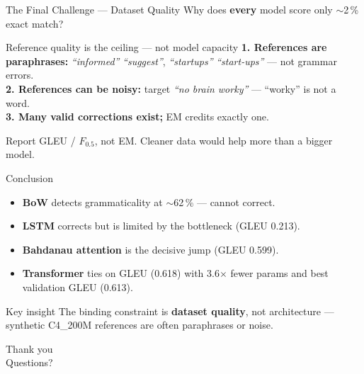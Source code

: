 \documentclass[aspectratio=169,11pt]{beamer}
\begin{document}
\begin{frame}{The Final Challenge --- Dataset Quality}
Why does \textbf{every} model score only $\sim$2\,\% exact match?
\vspace{0.6em}
\begin{block}{Reference quality is the ceiling --- not model capacity}
\small
\textbf{1. References are paraphrases:} \emph{``informed''}\,\textrightarrow{}\,\emph{``suggest''},
\emph{``startups''}\,\textrightarrow{}\,\emph{``start-ups''} --- not grammar errors.\\[3pt]
\textbf{2. References can be noisy:} target \emph{``no brain worky''} --- ``worky''
is not a word.\\[3pt]
\textbf{3. Many valid corrections exist;} EM credits exactly one.
\end{block}
\centering \small
\textrightarrow{} Report GLEU / $F_{0.5}$, not EM. Cleaner data would help more
than a bigger model.
\end{frame}

\begin{frame}{Conclusion}
\begin{itemize}
  \item \textbf{BoW} detects grammaticality at $\sim$62\,\% --- cannot correct.
  \item \textbf{LSTM} corrects but is limited by the bottleneck (GLEU 0.213).
  \item \textbf{Bahdanau attention} is the decisive jump (GLEU 0.599).
  \item \textbf{Transformer} ties on GLEU (0.618) with 3.6$\times$ fewer params
        and best validation GLEU (0.613).
\end{itemize}
\vspace{0.6em}
\begin{block}{Key insight}
The binding constraint is \textbf{dataset quality}, not architecture ---
synthetic C4\_200M references are often paraphrases or noise.
\end{block}
\end{frame}

\begin{frame}
\centering \Large Thank you \\[6pt]
\normalsize Questions?
\end{frame}
\end{document}
